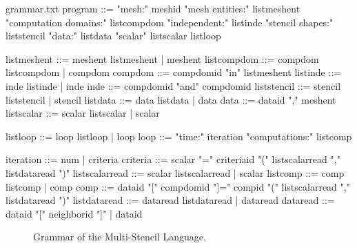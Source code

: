 \begin{filecontents*}{grammar.txt}
program ::= "mesh:" meshid 
            "mesh entities:" listmeshent
            "computation domains:" 
                      listcompdom
            "independent:"
                      listinde
            "stencil shapes:"
                      liststencil
            "data:" listdata
            "scalar" listscalar
            listloop

listmeshent ::= meshent listmeshent |  meshent
listcompdom ::= compdom listcompdom |  compdom
compdom ::= compdomid "in" listmeshent
listinde ::= inde listinde |  inde
inde ::= compdomid "and" compdomid
liststencil ::= stencil liststencil | stencil
listdata ::= data listdata |  data
data ::= dataid "," meshent
listscalar ::= scalar listscalar | scalar

listloop ::= loop listloop | loop
loop ::=  "time:" iteration
          "computations:" listcomp
          
iteration ::= num | criteria
criteria ::= scalar "=" criteriaid "(" listscalarread "," listdataread ")"
listscalarread ::= scalar listscalarread |  scalar
listcomp ::= comp listcomp |  comp
comp ::= dataid "[" compdomid "]=" compid "(" listscalarread "," listdataread ")"
listdataread ::= dataread listdataread |  dataread
dataread ::= dataid "[" neighborid "]" |  dataid
\end{filecontents*}

\begin{figure}[t]
  \hspace{5mm}
  \begin{minipage}[t]{\textwidth}
    {}   
    \caption{Grammar of the Multi-Stencil Language. \label{fig:grammar}}
  \end{minipage}
\end{figure}